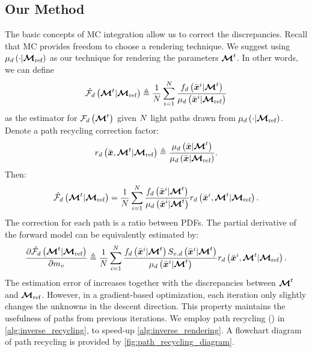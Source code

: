 \documentclass{article}
\begin{document}
\subsection{Our Method}
The basic concepts of \ac{MC} integration allow us to correct the discrepancies. Recall that \ac{MC} provides freedom to choose a rendering technique. We suggest using $\mu_{d}\left({\cdot|\boldsymbol{\mathcal{M}}_{\text{ref}}}\right)$ as our technique for rendering the parameters $\boldsymbol{\mathcal{M}}^{t}$. In other words, we can define
\begin{equation}
\label{eq:forward_simualtion_recycling}
\hat{\mathcal{F}_{d}}\left({\boldsymbol{\mathcal{M}}^{t}|\boldsymbol{\mathcal{M}}_{\text{ref}}}\right)\triangleq\frac{1}{N}\sum_{i=1}^{N}{\frac{f_{d}\left({\Bar{\boldsymbol{x}}^{i}|\boldsymbol{\mathcal{M}}^{t}}\right)}{\mu_{d}\left({\Bar{\boldsymbol{x}}^{i}|\boldsymbol{\mathcal{M}}_{\text{ref}}}\right)}}
\end{equation}
as the estimator for $\mathcal{F}_{d}\left({\boldsymbol{\mathcal{M}}^{t}}\right)$ given $N$ light paths drawn from $\mu_{d}\left({\cdot|\boldsymbol{\mathcal{M}}_{\text{ref}}}\right)$.
Denote a path recycling correction factor:
\begin{equation}
\label{eq:correction factor}
r_{d}\left({\Bar{\boldsymbol{x}},\boldsymbol{\mathcal{M}}^{t}|\boldsymbol{\mathcal{M}}_{\text{ref}}}\right)\triangleq\frac{\mu_{d}\left({\Bar{\boldsymbol{x}}|\boldsymbol{\mathcal{M}}^{t}}\right)}{\mu_{d}\left({\Bar{\boldsymbol{x}}|\boldsymbol{\mathcal{M}}_{\text{ref}}}\right)}.
\end{equation}
Then:
\begin{equation}
\label{eq:forward_simualtion_recycling_factor}
\hat{\mathcal{F}_{d}}\left({\boldsymbol{\mathcal{M}}^{t}|\boldsymbol{\mathcal{M}}_{\text{ref}}}\right)=\frac{1}{N}\sum_{i=1}^{N}{{\frac{f_{d}\left({\Bar{\boldsymbol{x}}^{i}|\boldsymbol{\mathcal{M}}^{t}}\right)}{\mu_{d}\left({\Bar{\boldsymbol{x}}^{i}|\boldsymbol{\mathcal{M}}^{t}}\right)}}}r_{d}\left({\Bar{\boldsymbol{x}}^{i},\boldsymbol{\mathcal{M}}^{t}|\boldsymbol{\mathcal{M}}_{\text{ref}}}\right) .
\end{equation}
The correction for each path is a ratio between \ac{PDF}s. The partial derivative of the forward model can be equivalently estimated by:
\begin{equation}
\label{eq:gradient_simualtion_recycling}
\dfrac{\partial {\hat{\mathcal{F}_{d}}\left({\boldsymbol{\mathcal{M}}^{t}|\boldsymbol{\mathcal{M}}_{\text{ref}}}\right)}}{\partial {m_{v}}}\triangleq\frac{1}{N}\sum_{i=1}^{N}{\frac{f_{d}\left({\Bar{\boldsymbol{x}}^{i}|\boldsymbol{\mathcal{M}}^{t}}\right)S_{v,d}\left({\Bar{\boldsymbol{x}}^{i}|\boldsymbol{\mathcal{M}}^{t}}\right)}{\mu_{d}\left({\Bar{\boldsymbol{x}}^{i}|\boldsymbol{\mathcal{M}}^{t}}\right)}} r_{d}\left({\Bar{\boldsymbol{x}}^{i},\boldsymbol{\mathcal{M}}^{t}|\boldsymbol{\mathcal{M}}_{\text{ref}}}\right).
\end{equation}
The estimation error of \eqs{\ref{eq:forward_simualtion_recycling_factor},\ref{eq:gradient_simualtion_recycling}} increases together with the discrepancies between $\boldsymbol{\mathcal{M}}^{t}$ and $\boldsymbol{\mathcal{M}}_{\text{ref}}$. However, in a gradient-based optimization, each iteration only slightly changes the unknowns in the descent direction. This property maintains the usefulness of paths from previous iterations. We employ path recycling (\eqsnopar{\ref{eq:forward_simualtion_recycling_factor},\ref{eq:gradient_simualtion_recycling}})  in \alg\ref{alg:inverse_recycling}, to speed-up \alg\ref{alg:inverse_rendering}. A flowchart diagram of path recycling is provided by \fig\ref{fig:path_recycling_diagram}.
\end{document}
